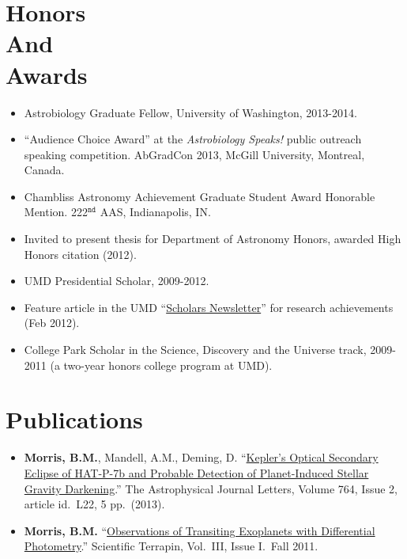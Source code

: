 \documentclass[margin]{res}
\begin{document}
\begin{resume}
\section{Honors\\And\\Awards} 
                 \begin{itemize}   
                  \item Astrobiology Graduate Fellow, University of Washington, 2013-2014.
                  \item ``Audience Choice Award'' at the \textit{Astrobiology Speaks!} public outreach speaking competition. AbGradCon 2013, McGill University, Montreal, Canada. 
                  \item Chambliss Astronomy Achievement Graduate Student Award Honorable Mention. 222$^{\mathtt{nd}}$ AAS, Indianapolis, IN.
		\item Invited to present thesis for Department of Astronomy Honors, awarded High Honors citation (2012).
                  \item UMD Presidential Scholar, 2009-2012.
		\item Feature article in the UMD ``\href{http://www.scholars.umd.edu/news/newsletter/363-february-2012-issue-1}{Scholars Newsletter}'' for research achievements (Feb 2012).
		\item College Park Scholar in the Science, Discovery and the Universe track, 2009-2011 (a two-year honors 
		college program at UMD). \\
                 \end{itemize}

\section{Publications} 
                 \begin{itemize}   
                  \item \textbf{Morris, B.M.}, Mandell, A.M., Deming, D. ``\href{http://adsabs.harvard.edu/abs/2013ApJ...764L..22M}{Kepler's Optical Secondary Eclipse of HAT-P-7b and Probable Detection of Planet-Induced Stellar Gravity Darkening}.'' The Astrophysical Journal Letters, Volume 764, Issue 2, article id.\ L22, 5 pp.\ (2013).
		\item \textbf{Morris, B.M.} ``\href{http://www.scientificterrapin.umd.edu/Fall2011.php}{Observations of Transiting Exoplanets with Differential Photometry}.'' Scientific Terrapin, Vol.\ III, Issue I.\ Fall 2011.\\
                 \end{itemize}


\end{resume}
\end{document}
